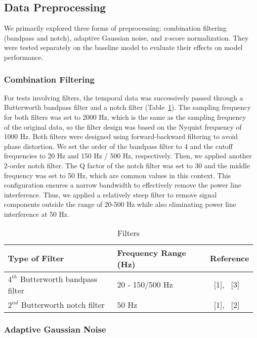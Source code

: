 \subsection{Data Preprocessing}

We primarily explored three forms of preprocessing: combination filtering (bandpass and notch), 
adaptive Gaussian noise, and z-score normalization.
They were tested separately on the baseline model to evaluate their effects on model performance.

\subsubsection{Combination Filtering}

For tests involving filters, the temporal data was successively passed through a Butterworth bandpass filter and a notch filter (Table~\ref{filters}).
The sampling frequency for both filters was set to 2000 Hz, which is the same as the sampling frequency of the original data,
so the filter design was based on the Nyquist frequency of 1000 Hz.
Both filters were designed using forward-backward filtering to avoid phase distortion.
We set the order of the bandpass filter to 4 and the cutoff frequencies to 20 Hz and 150 Hz / 500 Hz, respectively.
Then, we applied another 2-order notch filter.
The Q factor of the notch filter was set to 30 and the middle frequency was set to 50 Hz, 
which are common values in this context. This configuration ensures a narrow bandwidth to effectively remove the power line interference.
Thus, we applied a relatively steep filter to remove signal components outside the range of 20-500 Hz 
while also eliminating power line interference at 50 Hz.

\begin{table}
    \caption{Filters}
    \label{filters}
    \centering
    \begin{tabular}{lll}
      \toprule
      \cmidrule(r){1-2}
      Type of Filter     & Frequency Range (Hz)     & Reference \\
      \midrule
      $4^{th}$ Butterworth bandpass filter & 20 - 150/500 Hz  &  ~[1], ~[3]    \\
      $2^{nd}$ Butterworth notch filter    & 50 Hz        &  ~[1], ~[2]    \\
      \bottomrule
    \end{tabular}
  \end{table}
  
\subsubsection{Adaptive Gaussian Noise}

